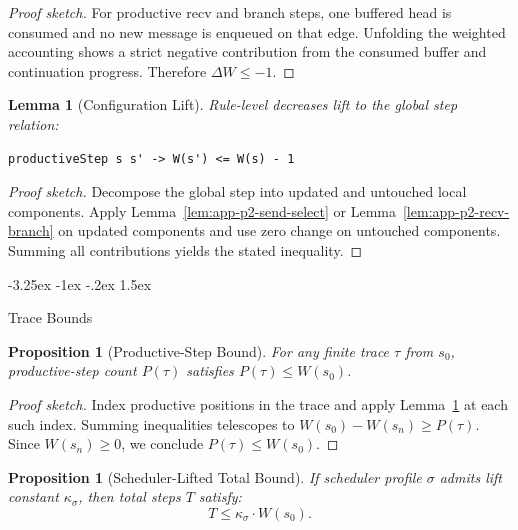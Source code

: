 \documentclass[a4paper,10pt,twocolumn,english]{article}
\makeatletter
\renewcommand{\subsection}{\@startsection{subsection}{2}{\z@}%
  {-3.25ex \@plus -1ex \@minus -.2ex}%
  {1.5ex}%
  {\raggedright\normalfont\normalsize\bfseries}}
\numberwithin{equation}{section}
\theoremstyle{paperdef}
\theoremstyle{paperplain}
\newtheorem{lemma}[definition]{Lemma}
\newtheorem{proposition}[definition]{Proposition}
\theoremstyle{paperdef}
\theoremstyle{paperremark}
\makeatother
\begin{document}
\begin{proof}[Proof sketch]
	For productive recv and branch steps, one buffered head is consumed and no new message is enqueued on that edge. Unfolding the weighted accounting shows a strict negative contribution from the consumed buffer and continuation progress. Therefore $\Delta W \le -1$.
\end{proof}

\begin{lemma}[Configuration Lift]
	\label{lem:app-p2-config-lift}
	Rule-level decreases lift to the global step relation:

	\noindent\begin{minipage}{\columnwidth}
		\begin{lstlisting}
productiveStep s s' -> W(s') <= W(s) - 1
\end{lstlisting}
	\end{minipage}
\end{lemma}

\begin{proof}[Proof sketch]
	Decompose the global step into updated and untouched local components. Apply Lemma~\ref{lem:app-p2-send-select} or Lemma~\ref{lem:app-p2-recv-branch} on updated components and use zero change on untouched components. Summing all contributions yields the stated inequality.
\end{proof}

\subsection{Trace Bounds}

\begin{proposition}[Productive-Step Bound]
	\label{prop:app-p2-productive-bound}
	For any finite trace $\tau$ from $s_0$, productive-step count $P(\tau)$ satisfies $P(\tau) \le W(s_0)$.
\end{proposition}

\begin{proof}[Proof sketch]
	Index productive positions in the trace and apply Lemma~\ref{lem:app-p2-config-lift} at each such index. Summing inequalities telescopes to $W(s_0) - W(s_n) \ge P(\tau)$. Since $W(s_n) \ge 0$, we conclude $P(\tau) \le W(s_0)$.
\end{proof}

\begin{proposition}[Scheduler-Lifted Total Bound]
	\label{prop:app-p2-scheduler-bound}
	If scheduler profile $\sigma$ admits lift constant $\kappa_\sigma$, then total steps $T$ satisfy:
	\begin{equation}
		T \le \kappa_\sigma \cdot W(s_0).
	\end{equation}
\end{proposition}
\end{document}
